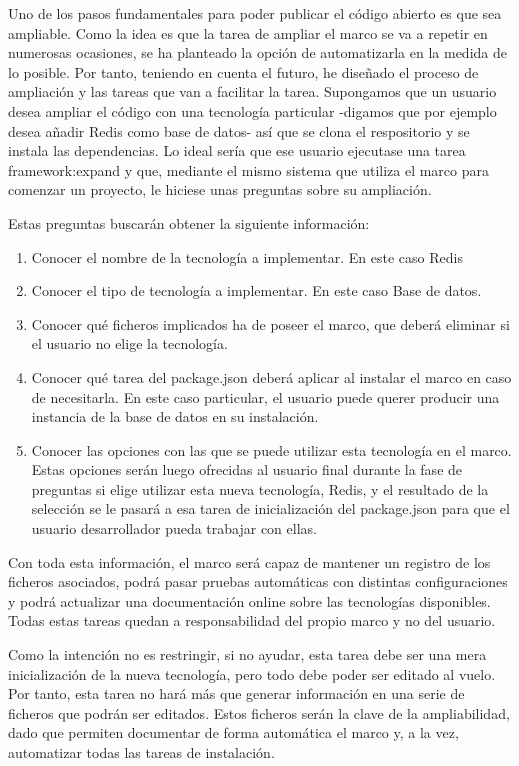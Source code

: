 Uno de los pasos fundamentales para poder publicar el código abierto es que sea ampliable. Como la idea es que la tarea de ampliar el marco se va a repetir en numerosas ocasiones, se ha planteado la opción de automatizarla en la medida de lo posible. Por tanto, teniendo en cuenta el futuro, he diseñado el proceso de ampliación y las tareas que van a facilitar la tarea. Supongamos que un usuario desea ampliar el código con una tecnología particular -digamos que por ejemplo desea añadir Redis como base de datos- así que se clona el respositorio y se instala las dependencias. Lo ideal sería que ese usuario ejecutase una tarea framework:expand y que, mediante el mismo sistema que utiliza el marco para comenzar un proyecto, le hiciese unas preguntas sobre su ampliación.

Estas preguntas buscarán obtener la siguiente información:
\begin{enumerate}
  \item Conocer el nombre de la tecnología a implementar. En este caso Redis
  \item Conocer el tipo de tecnología a implementar. En este caso Base de datos.
  \item Conocer qué ficheros implicados ha de poseer el marco, que deberá eliminar si el usuario no elige la tecnología.
  \item Conocer qué tarea del package.json deberá aplicar al instalar el marco en caso de necesitarla. En este caso particular, el usuario puede querer producir una instancia de la base de datos en su instalación.
  \item Conocer las opciones con las que se puede utilizar esta tecnología en el marco. Estas opciones serán luego ofrecidas al usuario final durante la fase de preguntas si elige utilizar esta nueva tecnología, Redis, y el resultado de la selección se le pasará a esa tarea de inicialización del package.json para que el usuario desarrollador pueda trabajar con ellas.
\end{enumerate}

Con toda esta información, el marco será capaz de mantener un registro de los ficheros asociados, podrá pasar pruebas automáticas con distintas configuraciones y podrá actualizar una documentación online sobre las tecnologías disponibles. Todas estas tareas quedan a responsabilidad del propio marco y no del usuario.

Como la intención no es restringir, si no ayudar, esta tarea debe ser una mera inicialización de la nueva tecnología, pero todo debe poder ser editado al vuelo. Por tanto, esta tarea no hará más que generar información en una serie de ficheros que podrán ser editados. Estos ficheros serán la clave de la ampliabilidad, dado que permiten documentar de forma automática el marco y, a la vez, automatizar todas las tareas de instalación.


